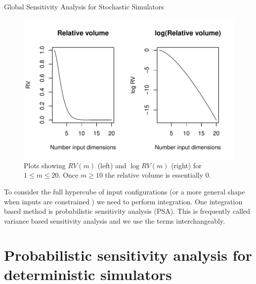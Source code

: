 \begin{chapter}{Global Sensitivity Analysis for Stochastic Simulators\label{Ch:sensitivity}}
\begin{figure}
  \includegraphics{fig-sensitivity/relative-volume.pdf}
  \caption{Plots showing $RV(m)$ (left) and $\log RV(m)$ (right) for $1 \leq m \leq 20$. Once $m  \geq 10$ the relative volume is essentially $0$. \label{Fig:relative-volume}}
\end{figure}
To consider the full hypercube of input configurations (or a more general shape when inputs are constrained \citep{Kucherenko2017, Kotidis2019}) we need to perform integration. One integration based method is probabilistic sensitivity analysis (PSA). This is frequently called variance based sensitivity analysis and we use the terms interchangeably.
\section{Probabilistic sensitivity analysis for deterministic simulators}

\end{chapter}
